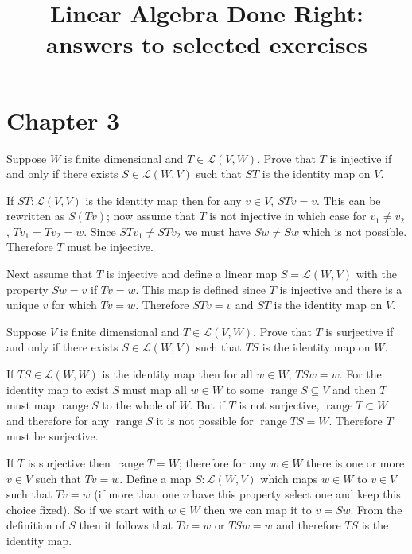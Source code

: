 \documentclass[11pt,a4paper]{scrartcl}
\title{Linear Algebra Done Right: \\ answers to selected exercises}
\author{ }
\date{}
\DeclareMathOperator{\range}{range}
\newcommand{\lmap}[2]{\mathcal{L}(#1,#2)}
\newcounter{problem}
\begin{document}
\maketitle

\section*{Chapter 3}

\begin{problem}[3.B.20]
    {
        Suppose $W$ is finite dimensional and $T \in  \lmap{V}{W}$. Prove that $T$ is injective 
        if and only if there exists $S \in \lmap{W}{V}$ such that $ST$ is the identity map on $V$.
    }
    {
        If $ST:\lmap{V}{V}$ is the identity map then for any $v\in V$, $STv=v$. 
        This can be rewritten as $S(Tv)$; now assume that $T$ is not injective in which case for $v_1\neq v_2$, 
        $Tv_1=Tv_2=w$. Since $STv_1 \neq STv_2$ we must have
        $Sw \neq Sw$ which is not possible. Therefore $T$ must be injective. 
        
        Next assume that $T$ is injective and define a linear map $S=\lmap{W}{V}$ with the property 
        $Sw=v$ if $Tv=w$. This map is defined since $T$ is injective and there is a unique $v$ for which $Tv=w$. Therefore 
        $STv=v$ and $ST$ is the identity map on $V$. 
    }
\end{problem}

\begin{problem}[3.B.21]
{
    Suppose $V$ is finite dimensional and $T \in  \lmap{V}{W}$. Prove that $T$ is surjective if and only if there 
    exists $S \in \lmap{W}{V}$ such that $TS$ is the identity map on $W$.
}
{
If $TS \in \lmap{W}{W}$ is the identity map then for all $w \in W$, $TSw=w$. For the identity map to exist $S$ must map all $w\in W$ to some $\range{S}\subseteq V$ and then $T$ must map
$\range S$ to the whole of $W$. But if $T$ is not surjective,
$\range{T}\subset W$ and therefore for any $\range{S}$ it is not possible for $\range{TS}=W$. Therefore $T$ must be surjective.

If $T$ is surjective then $\range{T}=W$; therefore
for any $w\in W$ there is one or more $v\in V$ such that $Tv=w$. Define a map $S:\lmap{W}{V}$ which maps $w\in W$ to
$v\in V$ such that $Tv=w$ (if more than one $v$ have this property select one and keep this choice fixed). So if we start with $w\in W$ then we can map it to $v=Sw$. From the definition of $S$ then it follows that $Tv=w$ or $TSw=w$ and therefore $TS$ is the identity map. 
}
\end{problem}
\end{document}
